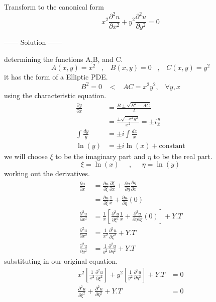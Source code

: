 \documentclass[]{article}
\begin{document}
\begin{example}
    Transform to the canonical form
    \[
        x^2\frac{\partial^2 u}{\partial x^2}+y^2\frac{\partial^2 u}{\partial y^2} = 0  
    \]
    \begin{center}
        ------ \textcolor{Solution}{Solution} ------ 
    \end{center}
    determining the functions A,B, and C.
    \[
        A\left(x,y\right)=x^2 \;\;\;,\;\;\; B\left(x,y\right)=0 \;\;\;,\;\;\; C\left(x,y\right)=y^2    
    \]
    it has the form of a Elliptic PDE.
    \[
        B^2 =0 \;\;\;<\;\;\; AC=x^2 y^{2}, \;\;\;\forall y, x  
    \]
    using the characteristic equation.
    \begin{align*}
        \frac{\partial y}{\partial x} &= \frac{B\pm\sqrt{B^2 -AC}}{A}
        \\
        &= \frac{\pm\sqrt{-x^2 y^2}}{x^2}=\pm i\frac{y}{x}
        \\
        \int\frac{dy}{y} &= \pm i\int\frac{dx}{x}
        \\
        \ln\left(y\right) &= \pm i \ln\left(x\right)+\text{constant}
    \end{align*}
    we will choose $\xi$ to be the imaginary part and $\eta$ to be the real part.
    \[
        \xi = \ln\left(x\right) \;\;\;\;\; , \;\;\;\;\; \eta = \ln\left(y\right)    
    \]
    working out the derivatives.
    \begin{align*}
        \frac{\partial u}{\partial x} &= \frac{\partial u}{\partial\xi}\frac{\partial\xi}{\partial x} + \frac{\partial u }{\partial\eta}\frac{\partial\eta}{\partial x}
        \\
        &= \frac{\partial u}{\partial\xi}\frac{1}{x}+\frac{\partial u}{\partial\eta}\left(0\right)
        \\
        \frac{\partial^2 u}{\partial x^2} &= \frac{1}{x}\left[\frac{\partial^2 u}{\partial\xi^2}\frac{1}{x}+\frac{\partial^2 u}{\partial\eta\partial\xi}\left(0\right)\right] + Y.T
        \\
        \frac{\partial^2 u}{\partial x^2} &=\frac{1}{x^2}\frac{\partial^2 u}{\partial\xi^2}+Y.T
        \\
        \frac{\partial^2 u}{\partial y^2} &=\frac{1}{y^2}\frac{\partial^2 u}{\partial\eta^2}+Y.T
    \end{align*}
    substituting in our original equation.
    \begin{align*}
        x^2\left[\frac{1}{x^2}\frac{\partial^2 u}{\partial\xi^2}\right]+y^2\left[\frac{1}{y^2}\frac{\partial^2 u}{\partial\eta^2}\right]+Y.T &= 0
        \\
        \frac{\partial^2 u}{\partial\xi^2}+\frac{\partial^2 u}{\partial\eta^2}+Y.T &=0
    \end{align*}
\end{example}
\end{document}
